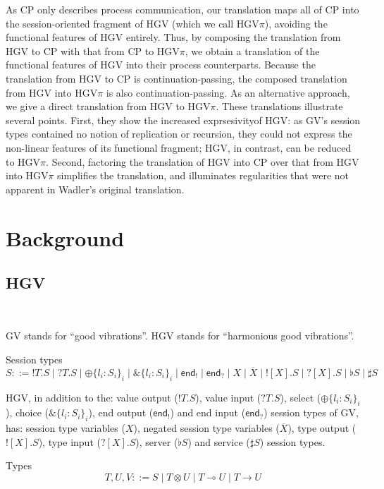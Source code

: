 \documentclass{easychair}
\newcommand{\key}{\mathsf}
\newcommand{\set}[1]{\{ #1 \}}
\newcommand{\row}[2]{\set{#1}_{#2}}
\newcommand{\gvOutput}[2]{\mathord{!}{#1}.{#2}}
\newcommand{\gvInput}[2]{\mathord{?}{#1}.{#2}}
\newcommand{\gvEndOutput}{\key{end}_!}
\newcommand{\gvEndInput}{\key{end}_?}
\newcommand{\gvPlus}[2]{\oplus \row{#1}{#2}}
\newcommand{\gvChoice}[2]{\binampersand \row{#1}{#2}}
\newcommand{\gvServer}[1]{\flat {#1}}
\newcommand{\gvService}[1]{\sharp {#1}}
\newcommand{\gvDual}[1]{\overline{#1}}
\newcommand{\gvOutputType}[2]{![{#1}].{#2}}
\newcommand{\gvInputType}[2]{?[{#1}].{#2}}
\newcommand{\la}{l}
\newcommand{\lolli}{\multimap}
\newcommand{\gvLinFun}[2]{{#1} \lolli {#2}}
\newcommand{\gvUnFun}[2]{{#1} \to {#2}}
\newcommand{\gvTimes}[2]{{#1} \otimes {#2}}
\newcommand{\hgv}{HGV\xspace}
\newcommand{\hgvpi}{HGV$\pi$\xspace}
\begin{document}
As CP only describes process communication, our translation maps all of CP into the session-oriented
fragment of HGV (which we call \hgvpi), avoiding the functional features of \hgv entirely.  Thus, by
composing the translation from \hgv to CP with that from CP to \hgvpi, we obtain a translation of
the functional features of \hgv into their process counterparts.  Because the translation from \hgv
to CP is continuation-passing, the composed translation from \hgv into \hgvpi is also
continuation-passing.  As an alternative approach, we give a direct translation from \hgv to \hgvpi.
These translations illustrate several points.  First, they show the increased exprsesivityof \hgv:
as GV's session types contained no notion of replication or recursion, they could not express the
non-linear features of its functional fragment; \hgv, in contrast, can be reduced to \hgvpi.
Second, factoring the translation of \hgv into CP over that from \hgv into \hgvpi simplifies the
translation, and illuminates regularities that were not apparent in Wadler's original translation.

\section{Background}


\subsection{\hgv}
~

GV stands for ``good vibrations''. \hgv stands for ``harmonious good
vibrations''.

Session types
\[
S ::= \gvOutput{T}{S} \mid \gvInput{T}{S} \mid
      \gvPlus{\la_i:S_i}{i} \mid \gvChoice{\la_i:S_i}{i} \mid
      \gvEndOutput \mid \gvEndInput \mid
      X \mid \gvDual{X} \mid
      \gvOutputType{X}{S} \mid \gvInputType{X}{S} \mid
      \gvServer{S} \mid \gvService{S}
\]

\hgv, in addition to the: value output ($\gvOutput{T}{S}$), value
input ($\gvInput{T}{S}$), select ($\gvPlus{\la_i:S_i}{i}$), choice
($\gvChoice{\la_i:S_i}{i}$), end output ($\gvEndOutput$) and end input
($\gvEndInput$) session types of GV, has: session type variables
($X$), negated session type variables ($\gvDual{X}$), type output
($\gvOutputType{X}{S}$), type input ($\gvInputType{X}{S}$), server
($\gvServer{S}$) and service ($\gvService{S}$) session types.


Types
\[
T,U,V ::= S \mid \gvTimes{T}{U} \mid \gvLinFun{T}{U} \mid \gvUnFun{T}{U}
\]
\end{document}
